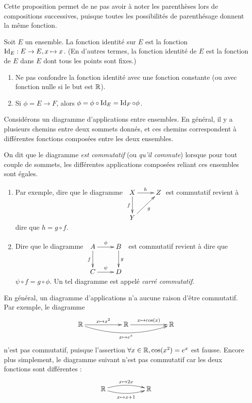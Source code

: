 Cette proposition permet de ne pas avoir à noter les parenthèses lors de compositions successives, puisque toutes les possibilités de parenthésage donnent la même fonction.

\begin{definition}
Soit $E$ un ensemble. La fonction identité sur $E$ est la fonction $\operatorname{Id}_E : E\to E, x\mapsto x$. (En d'autres termes, la fonction identité de $E$ est la fonction de $E$ dans $E$ dont tous les points sont fixes.)
\end{definition}

\begin{attention}
\begin{enumerate}
\item Ne pas confondre la fonction identité avec une fonction constante (ou avec fonction nulle si le but est $\mathbb{R}$).
\item Si $\phi = E\to F$, alors $\phi = \phi\circ \operatorname{Id}_E = \operatorname{Id}_F\circ \phi$.
\end{enumerate}
\end{attention}


\begin{definition}
Considérons un diagramme d'applications entre ensembles. En général, il y a plusieurs chemins entre deux sommets donnés, et ces chemins correspondent à différentes fonctions composées entre les deux ensembles.

On dit que le diagramme \emph{est commutatif} (ou \emph{qu'il commute}) lorsque pour tout couple de sommets, les différentes applications composées reliant ces ensembles sont égales.
\end{definition}

\begin{exemple}
\begin{enumerate}
\item  Par exemple, dire que le diagramme
$
\xymatrix{
X \ar[d]_{f} \ar[r]^{h}& Z \\
Y \ar[ur]_{g}& 
}
$
est commutatif revient à dire que $h = g\circ f$.
\item Dire que le diagramme 
$\xymatrix{
A \ar[r]^{\phi} \ar[d]_{f} & B \ar[d]^{g}\\
C \ar[r]^{\psi}& D 
}$
est commutatif revient à dire que $\psi\circ f = g \circ \phi$. Un tel diagramme est appelé \emph{carré commutatif}.
\end{enumerate}
\end{exemple}

\begin{attention}
En général, un diagramme d'applications n'a aucune raison d'être commutatif.
Par exemple, le diagramme
\[\xymatrix{
\R \ar[rr]^{x\mapsto x^2} \ar@/_1pc/[rrrr]_{x\mapsto e^x}  & & \R \ar[rr]^{x\mapsto \cos(x)} & & \R
}\]
n'est pas commutatif, puisque l'assertion \og $\forall x\in \mathbb{R}, \cos(x^2)=e^{x}$\fg{} est fausse. Encore plus simplement, le diagramme suivant n'est pas commutatif car les deux fonctions sont différentes :
\[\xymatrix{
\R \ar@/^/[rr]^{x\mapsto 2x} \ar@/_/[rr]_{x\mapsto x+1} & & \R
}\]
\end{attention}

